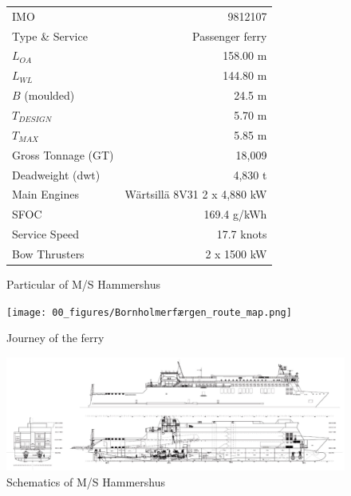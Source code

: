\documentclass[]{interact}
\theoremstyle{plain}%
\theoremstyle{definition}
\theoremstyle{remark}
\begin{document}
\begin{figure}
  \begin{minipage}{0.55\linewidth} %
    \footnotesize
    \centering
    \begin{tabular}{l r}
        \hline
        IMO & 9812107 \\
        Type \& Service & Passenger ferry \\
        $L_{OA}$ & 158.00 m\\
        $L_{WL}$ & 144.80 m\\
        $B$ (moulded) & 24.5 m\\
        $T_{DESIGN}$ & 5.70 m\\
        $T_{MAX}$ & 5.85 m \\ 
        Gross Tonnage (GT) & 18,009 \\
        Deadweight (dwt) & 4,830 t \\
        Main Engines & Wärtsillä 8V31 2 x 4,880 kW \\
        SFOC & 169.4 g/kWh \\
        Service Speed & 17.7 knots \\
        Bow Thrusters & 2 x 1500 kW \\
        \hline
    \end{tabular}
    \caption{Particular of M/S Hammershus}
    \label{tbl:Hammershus_Data}
  \end{minipage}
  \hspace{0.01\linewidth}
  \begin{minipage}{0.43\linewidth} %
    \centering
    \texttt{[image: 00\_figures/Bornholmerfærgen\_route\_map.png]} %
    \caption{Journey of the ferry}
    \label{fig:Hammershus_journey_map}
  \end{minipage}
\end{figure}

\begin{figure}
  \centering
      \includegraphics[width=.75\textwidth]{00_figures/Hammershus_Pict.jpg}
      \caption{Schematics of M/S Hammershus}
      \label{fig:Hammershus_Pict}
\end{figure}
\end{document}
